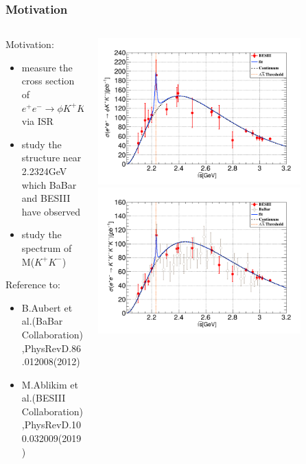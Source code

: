 \documentclass[aspectratio=169]{ctexbeamer}
\begin{document}
\begin{frame}
  \frametitle{Motivation}
  \begin{columns}
    \begin{column}{0.5\textwidth}
      Motivation:
      \begin{itemize}
        \item measure the cross section of $e^+ e^- \to \phi K^+ K^-$ via ISR
        \item study the structure near 2.2324GeV which BaBar and BESIII have observed
        \item study the spectrum of M($K^+ K^-$)
      \end{itemize}
      Reference to:
      \begin{itemize}
        \item B.Aubert et al.(BaBar Collaboration),PhysRevD.86.012008(2012) 
        \item M.Ablikim et al.(BESIII Collaboration),PhysRevD.100.032009(2019)
      \end{itemize}

    \end{column}

    \begin{column}{0.5\textwidth}
       \includegraphics[width=0.8\textwidth]{figures/phikk.png}
      \includegraphics[width=0.8\textwidth]{figures/kkkk_nogreen.png}
    \end{column}
  \end{columns}
\end{frame}
\end{document}
